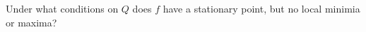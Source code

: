 Under what conditions on $Q$ does $f$ have a stationary point, but no local minimia or maxima?

\begin{solution}
    \ \\
    \vfill
\end{solution}